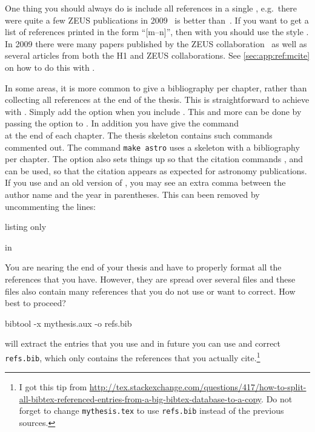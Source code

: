 One thing you should always do is include all references in a single
, e.g.\ there were quite a few ZEUS publications in
2009~\cite{Chekanov:2009qja,Chekanov:2009zz,Chekanov:2009tu} is better
than~\cite{Chekanov:2009qja}\cite{Chekanov:2009zz}\cite{Chekanov:2009tu}.
If you want to get a list of references printed in the form \enquote{[m--n]},
then with  you should use the style
. In 2009 there were many papers published by the
ZEUS
collaboration~\cite{Chekanov:2009qja,Chekanov:2009zz,Chekanov:2009tu}
as well as several articles from both the H1 and ZEUS
collaborations\cite{Chekanov:2009wt,Aaron:2009wg}.
See \cref{sec:app:ref:mcite} on how to do this with \BibTeX.

In some areas, it is more common to give a bibliography per chapter,
rather than collecting all references at the end of the thesis.
This is straightforward to achieve with .
Simply add the option  when you include .
This and more can be done by passing the option  to .
In addition you have give the command\\
 at the end of each chapter.
The thesis skeleton contains such commands commented out.
The command \texttt{make astro} uses a skeleton with a bibliography per chapter.
The option  also sets things up so that the  citation
commands ,  and  can be used,
so that the citation appears as expected for astronomy publications.
If you use  and an old version of ,
you may see an extra comma between the author name and the year in parentheses.
This can been removed by uncommenting the lines:
\begin{tcblisting}{listing only}
\end{tcblisting}
in 

You are nearing the end of your thesis and have to properly format all
the references that you have. However, they are spread over several
files and these files also contain many references that you do not use
or want to correct. How best to proceed?
\begin{bashlisting}
bibtool -x mythesis.aux -o refs.bib
\end{bashlisting}
will extract the entries that you use and in future you can use and
correct \texttt{refs.bib}, which only contains the references that you
actually cite.\footnote{%
I got this tip from
\url{http://tex.stackexchange.com/questions/417/how-to-split-all-bibtex-referenced-entries-from-a-big-bibtex-database-to-a-copy}.
Do not forget to change \texttt{mythesis.tex} to use
\texttt{refs.bib} instead of the previous sources.}

